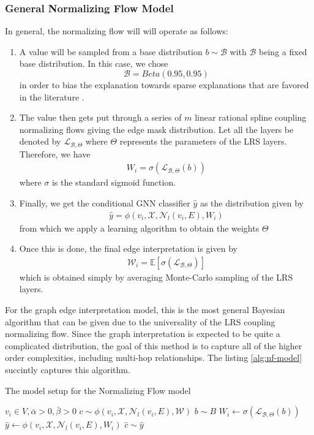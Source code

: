 \subsubsection{General Normalizing Flow Model}
In general, the normalizing flow will will operate as follows:
\begin{enumerate}
	\item A value will be sampled from a base distribution $b \sim \mathcal{B}$ with $\mathcal{B}$ being a fixed base distribution. In this case, we chose 
	\[
		\mathcal{B} = Beta(0.95, 0.95)
	\]
	in order to bias the explanation towards sparse explanations that are favored in the literature \cite{yuan_explainability_2021}.
	\item The value then gets put through a series of $m$ linear rational spline coupling normalizing flows giving the edge mask distribution. Let all the layers be denoted by $\mathcal{L}_{\mathcal{B}, \Theta}$ where $\Theta$ represents the parameters of the LRS layers. Therefore, we have
	\begin{align*}
		W_i = \sigma(\mathcal{L}_{\mathcal{B}, \Theta}(b))
	\end{align*}
	where $\sigma$ is the standard sigmoid function.
	\item Finally, we get the conditional GNN classifier $\hat{y}$ as the distribution given by
	\begin{align*}
		\hat{y} = \phi(v_i, \mathcal{X}, \mathcal{N}_l(v_i, E), W_i)
	\end{align*}
	from which we apply a learning algorithm to obtain the weights $\Theta$
	\item Once this is done, the final edge interpretation is given by
	\begin{align*}
		\mathcal{W}_i = \mathbb{E}[\sigma(\mathcal{L}_{\mathcal{B}, \Theta})]
	\end{align*}
	which is obtained simply by averaging Monte-Carlo sampling of the LRS layers.
\end{enumerate}
For the graph edge interpretation model, this is the most general Bayesian algorithm that can be given due to the universality of the LRS coupling normalizing flow. Since the graph interpretation is expected to be quite a complicated distribution, the goal of this method is to capture all of the higher order complexities, including multi-hop relationships. The listing \ref{alg:nf-model} succintly captures this algorithm.
\begin{algorithm}[h]
	\centering
	\caption{The model setup for the Normalizing Flow model}
	\label{alg:nf-model}
	\begin{algorithmic}
		\Require $v_i \in V, \bar{\alpha} > 0, \bar{\beta} > 0$
		\Require $c \sim \phi(v_i, \mathcal{X}, \mathcal{N}_l(v_i, E), \mathcal{W})$
		\State $b \sim B$
		\State $W_i \gets \sigma(\mathcal{L}_{\mathcal{B}, \Theta}(b))$
		\State $\hat{y} \gets \phi(v_i, \mathcal{X}, \mathcal{N}_l(v_i, E), W_i)$
		\State $\hat{c} \sim \hat{y}$
	\end{algorithmic}
\end{algorithm}

